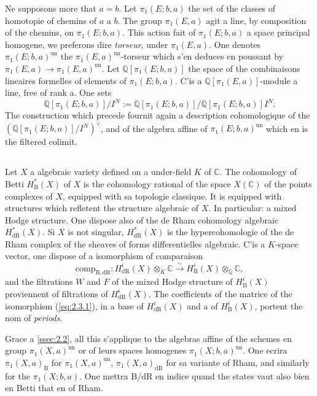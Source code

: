 \documentclass[11pt,a4paper]{article}
\theoremstyle{plain}
\theoremstyle{definition}
\newcommand{\Q}{\mathbb{Q}}
\newcommand{\C}{\mathbb{C}}
\newcommand{\dR}{\mathrm{dR}}
\newcommand{\B}{\mathrm{B}}
\newcommand{\comp}{\mathrm{comp}}
\begin{document}
Ne supposons more that $a = b$. Let $\pi_1(E;b,a)$ the set of the classes of homotopie of chemins of $a$ a $b$. The group $\pi_1(E,a)$ agit a line, by composition of the chemins, on $\pi_1(E;b,a)$. This action fait of $\pi_1(E;b,a)$ a space principal homogene, we preferons dire \emph{torseur}, under $\pi_1(E,a)$. One denotes $\pi_1(E;b,a)^{\mathrm{un}}$ the $\pi_1(E,a)^{\mathrm{un}}$-torseur which s'en deduces en poussant by $\pi_1(E,a) \to \pi_1(E,a)^{\mathrm{un}}$. Let $\Q[\pi_1(E;b,a)]$ the space of the combinaisons lineaires formelles of elements of $\pi_1(E;b,a)$. C'is a $\Q[\pi_1(E,a)]$-module a line, free of rank a. One sets
\[
\Q[\pi_1(E;b,a)]/I^N := \Q[\pi_1(E;b,a)]/\Q[\pi_1(E;b,a)]I^N.
\]
The construction which precede fournit again a description cohomologique of the $(\Q[\pi_1(E;b,a)]/I^N)^\vee$, and of the algebra affine of $\pi_1(E;b,a)^{\mathrm{un}}$ which en is the filtered colimit.

\subsection{}\label{ssec:2.3}

Let $X$ a algebraic variety defined on a under-field $K$ of $\C$. The cohomology of Betti $H_{\B}^*(X)$ of $X$ is the cohomology rational of the space $X(\C)$ of the points complexes of $X$, equipped with sa topologie classique. It is equipped with structures which refletent the structure algebraic of $X$. In particular: a mixed Hodge structure. One dispose also of the de Rham cohomology algebraic $H_{\dR}^*(X)$. Si $X$ is not singular, $H_{\dR}^*(X)$ is the hypercohomologie of the de Rham complex of the sheaves of forms differentielles algebraic. C'is a $K$-space vector, one dispose of a isomorphism of comparaison
\begin{equation}\label{eq:2.3.1}
\comp_{\B,\dR} : H_{\dR}^i(X) \otimes_K \C \xrightarrow{\sim} H_{\B}^i(X) \otimes_{\Q} \C,
\end{equation}
and the filtrations $W$ and $F$ of the mixed Hodge structure of $H_{\B}^i(X)$ proviennent of filtrations of $H_{\dR}^i(X)$. The coefficients of the matrice of the isomorphism (\ref{eq:2.3.1}), in a base of $H_{\dR}^i(X)$ and a of $H_{\B}^i(X)$, portent the nom of \emph{periods}.

Grace a \ref{ssec:2.2}, all this s'applique to the algebras affine of the schemes en group $\pi_1(X,a)^{\mathrm{un}}$ or of leurs spaces homogenes $\pi_1(X;b,a)^{\mathrm{un}}$. One ecrira $\pi_1(X,a)_{\B}$ for $\pi_1(X,a)^{\mathrm{un}}$, $\pi_1(X,a)_{\dR}$ for sa variante of Rham, and similarly for the $\pi_1(X;b,a)$. One mettra $\B$/$\dR$ en indice quand the states vaut also bien en Betti that en of Rham.
\end{document}
